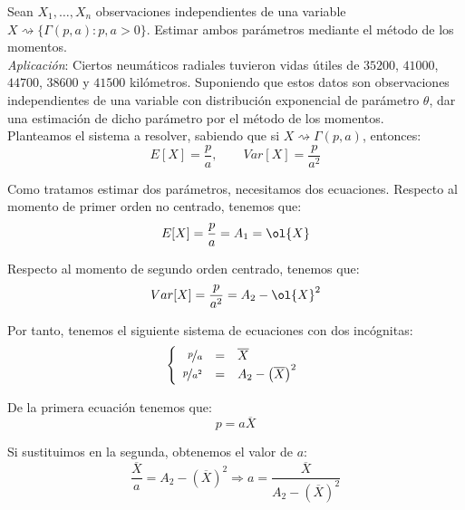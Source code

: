 \begin{ejercicio}
    Sean $X_1, \ldots, X_n$ observaciones independientes de una variable $X\rightsquigarrow\{\Gamma(p,a) : p,a>0\}$. Estimar ambos parámetros mediante el método de los momentos.\\

    \noindent
    \textit{Aplicación}: Ciertos neumáticos radiales tuvieron vidas útiles de $35200$, $41000$, $44700$, $38600$ y $41500$ kilómetros. Suponiendo que estos datos son observaciones independientes de una variable con distribución exponencial de parámetro $\theta$, dar una estimación de dicho parámetro por el método de los momentos.\\

    Planteamos el sistema a resolver, sabiendo que si $X\rightsquigarrow \Gamma(p,a)$, entonces:
    \begin{equation*}
        E[X] = \frac{p}{a}, \qquad Var[X] = \frac{p}{a^2}
    \end{equation*}

    Como tratamos estimar dos parámetros, necesitamos dos ecuaciones. Respecto al momento de primer orden no centrado, tenemos que:
    \begin{equation*}
        E[X] = \frac{p}{a} =A_1 = \ol{X}
    \end{equation*}

    Respecto al momento de segundo orden centrado, tenemos que:
    \begin{equation*}
        Var[X] = \frac{p}{a^2} = A_2 - \ol{X}^2
    \end{equation*}

    Por tanto, tenemos el siguiente sistema de ecuaciones con dos incógnitas:
    \begin{equation*}
        \left\{\begin{array}{rcl}
                \nicefrac{p}{a} &=& \overline{X} \\
                \nicefrac{p}{a^2} &=& A_2 - {\left(\overline{X}\right)}^2
        \end{array}\right.
    \end{equation*}
    
    De la primera ecuación tenemos que:
    \begin{equation*}
        p = a\overline{X}
    \end{equation*}
    
    Si sustituimos en la segunda, obtenemos el valor de $a$:
    \begin{equation*}
        \frac{\overline{X}}{a} = A_2 - {\left(\overline{X}\right)}^2 \Longrightarrow a = \frac{\overline{X}}{A_2-{\left(\overline{X}\right)}^2}
    \end{equation*}


\end{ejercicio}
